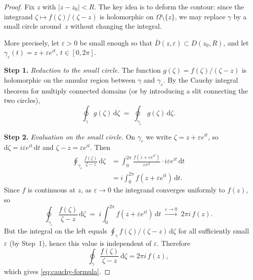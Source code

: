 \documentclass[12pt,a4paper,openany]{book}
\theoremstyle{definition}
\theoremstyle{plain}
\theoremstyle{remark}
\newcommand{\dd}{\mathrm{d}}
\newcommand{\abs}[1]{\left|#1\right|}
\begin{document}
\begin{proof}
Fix $z$ with $\abs{z-z_0}<R$. The key idea is to deform the contour: since the
integrand $\zeta\mapsto f(\zeta)/(\zeta-z)$ is holomorphic on $\Omega\setminus\{z\}$,
we may replace $\gamma$ by a small circle around~$z$ without changing the integral.

More precisely, let $\varepsilon>0$ be small enough so that $\overline{D}(z,\varepsilon)\subset D(z_0,R)$, and let $\gamma_\varepsilon(t)=z+\varepsilon e^{it}$, $t\in[0,2\pi]$.

\medskip
\noindent\textbf{Step 1.} \emph{Reduction to the small circle.}
The function $g(\zeta)=f(\zeta)/(\zeta-z)$ is holomorphic on the annular region
between $\gamma$ and $\gamma_\varepsilon$. By the Cauchy integral theorem for
multiply connected domains (or by introducing a slit connecting the two circles),
\[
  \oint_\gamma g(\zeta)\,\dd\zeta \;=\; \oint_{\gamma_\varepsilon} g(\zeta)\,\dd\zeta.
\]

\begin{center}
\end{center}

\noindent\textbf{Step 2.} \emph{Evaluation on the small circle.}
On $\gamma_\varepsilon$ we write $\zeta = z + \varepsilon e^{it}$, so
$\dd\zeta = i\varepsilon e^{it}\,\dd t$ and $\zeta - z = \varepsilon e^{it}$.
Then
\begin{align*}
  \oint_{\gamma_\varepsilon}\frac{f(\zeta)}{\zeta-z}\,\dd\zeta
  &= \int_0^{2\pi}\frac{f(z+\varepsilon e^{it})}{\varepsilon e^{it}}\cdot
     i\varepsilon e^{it}\,\dd t \\
  &= i\int_0^{2\pi}f(z+\varepsilon e^{it})\,\dd t.
\end{align*}
Since $f$ is continuous at $z$, as $\varepsilon\to 0$ the integrand converges
uniformly to $f(z)$, so
\[
  \oint_{\gamma_\varepsilon}\frac{f(\zeta)}{\zeta-z}\,\dd\zeta
  \;=\; i\int_0^{2\pi}f(z+\varepsilon e^{it})\,\dd t
  \;\xrightarrow{\varepsilon\to 0}\; 2\pi i\,f(z).
\]
But the integral on the left equals $\oint_\gamma f(\zeta)/(\zeta-z)\,\dd\zeta$
for all sufficiently small $\varepsilon$ (by Step~1), hence this value is
independent of $\varepsilon$. Therefore
\[
  \oint_\gamma\frac{f(\zeta)}{\zeta-z}\,\dd\zeta = 2\pi i\,f(z),
\]
which gives \eqref{eq:cauchy-formula}.
\end{proof}
\end{document}

